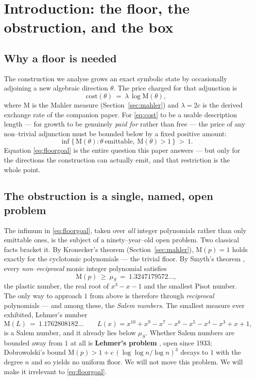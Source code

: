 \documentclass[11pt]{article}
\theoremstyle{plain}
\theoremstyle{definition}
\theoremstyle{remark}
\newcommand{\Mah}{\mathrm{M}}
\begin{document}
\tableofcontents

\section{Introduction: the floor, the obstruction, and the box}\label{sec:intro}

\subsection{Why a floor is needed}
The construction we analyse grows an exact symbolic state by occasionally adjoining a new algebraic direction $\theta$. The price charged for that adjunction is
\begin{equation}\label{eq:cost}
\text{cost}(\theta)\ =\ \lambda\,\log\Mah(\theta),
\end{equation}
where $\Mah$ is the Mahler measure (Section~\ref{sec:mahler}) and $\lambda=2c$ is the derived exchange rate of the companion paper. For \eqref{eq:cost} to be a usable description length --- for growth to be genuinely \emph{paid for} rather than free --- the price of any non--trivial adjunction must be bounded below by a fixed positive amount:
\begin{equation}\label{eq:floorgoal}
\inf\bigl\{\,\Mah(\theta):\theta\ \text{emittable},\ \Mah(\theta)>1\,\bigr\}\ >\ 1.
\end{equation}
Equation \eqref{eq:floorgoal} is the entire question this paper answers --- but only for the directions the construction can actually emit, and that restriction is the whole point.

\subsection{The obstruction is a single, named, open problem}\label{sec:obstruction}
The infimum in \eqref{eq:floorgoal}, taken over \emph{all} integer polynomials rather than only emittable ones, is the subject of a ninety--year--old open problem. Two classical facts bracket it. By Kronecker's theorem (Section~\ref{sec:mahler}), $\Mah(p)=1$ holds exactly for the cyclotomic polynomials --- the trivial floor. By Smyth's theorem \cite{Smyth}, every \emph{non--reciprocal} monic integer polynomial satisfies
\[
\Mah(p)\ \ge\ \mu_S\ =\ 1.3247179572\ldots,
\]
the plastic number, the real root of $x^3-x-1$ and the smallest Pisot number. The only way to approach $1$ from above is therefore through \emph{reciprocal} polynomials --- and among these, the \emph{Salem numbers}. The smallest measure ever exhibited, Lehmer's number
\[
\Mah(L)\ =\ 1.1762808182\ldots\qquad
L(x)=x^{10}+x^9-x^7-x^6-x^5-x^4-x^3+x+1,
\]
is a Salem number, and it already lies below $\mu_S$. Whether Salem numbers are bounded away from $1$ at all is \textbf{Lehmer's problem} \cite{Lehmer}, open since 1933; Dobrowolski's bound $\Mah(p)>1+c\,(\log\log n/\log n)^3$ \cite{Dobrowolski} decays to $1$ with the degree $n$ and so yields no uniform floor. We will not move this problem. We will make it irrelevant to \eqref{eq:floorgoal}.
\end{document}
